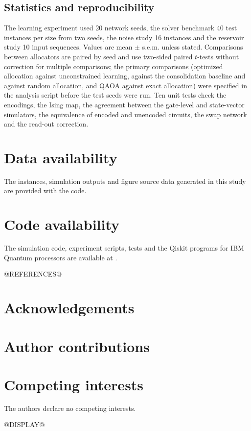 \subsection*{Statistics and reproducibility}
The learning experiment used 20 network seeds, the solver benchmark 40 test instances per size from two seeds, the noise study 16 instances and the reservoir study 10 input sequences. Values are mean $\pm$ s.e.m. unless stated. Comparisons between allocators are paired by seed and use two-sided paired $t$-tests without correction for multiple comparisons; the primary comparisons (optimized allocation against unconstrained learning, against the consolidation baseline and against random allocation, and QAOA against exact allocation) were specified in the analysis script before the test seeds were run. Ten unit tests check the encodings, the Ising map, the agreement between the gate-level and state-vector simulators, the equivalence of encoded and unencoded circuits, the swap network and the read-out correction.

\section*{Data availability}
The instances, simulation outputs and figure source data generated in this study are provided with the code. 

\section*{Code availability}
The simulation code, experiment scripts, tests and the Qiskit programs for IBM Quantum processors are available at .

@REFERENCES@

\section*{Acknowledgements}

\section*{Author contributions}

\section*{Competing interests}
The authors declare no competing interests. 

@DISPLAY@

